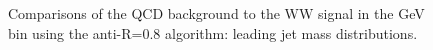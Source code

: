 \begin{figure}
\begin{center}
\caption{Comparisons of the QCD background to the WW signal in the  GeV bin using the anti-\kT R=0.8 algorithm: leading
  jet mass distributions.}
\label{fig:pt500_mass_AKt_R08}
\end{center}
\end{figure}

